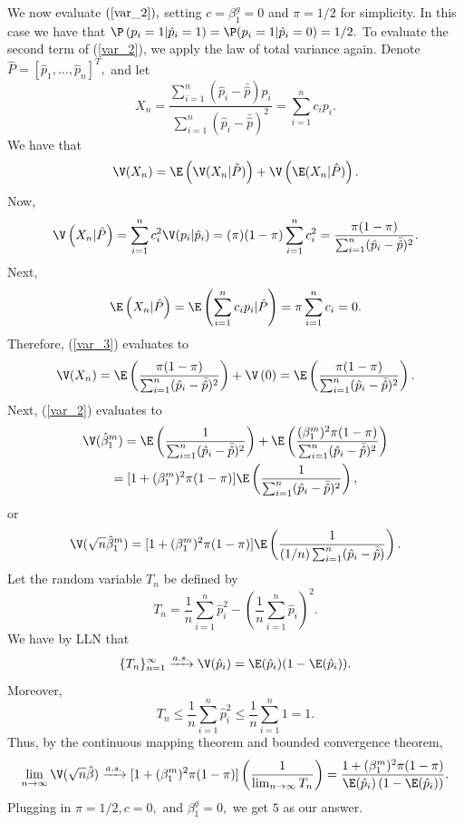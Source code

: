 \documentclass[12pt]{article}
\begin{document}
We now evaluate $(\ref{var_2}),$ setting $c = \beta_1^g = 0$ and $\pi = 1/2$ for simplicity. In this case we have that $\P\left(p_i = 1 | \hat{p}_i = 1 \right) = \P(p_i = 1 | \hat{p}_i = 0) = 1/2.$  To evaluate the second term of (\ref{var_2}), we apply the law of total variance again. Denote $\hat{P} = [\hat{p}_1, \dots, \hat{p}_n]^T,$ and let $$ X_n = \frac{ \sum_{i=1}^n (\hat{p}_i - \bar{\hat{p}} ) p_i}{ \sum_{i=1}^n (\hat{p}_i - \bar{\hat{p}})^2} = \sum_{i=1}^n c_i p_i.$$ We have that 
\begin{equation}\label{var_3}
\V(X_n)  = \E \left(\V( X_n | \hat{P} )\right) + \V \left( \E (X_n | \hat{P})\right).
\end{equation} Now,
$$\V \left( X_n | \hat{P} \right) = \sum_{i=1}^n c_i^2 \V(p_i  | \hat{p}_i ) = (\pi)(1-\pi) \sum_{i=1}^n c_i^2 = \frac{ \pi(1-\pi)}{\sum_{i=1}^n (\hat{p}_i - \bar{\hat{p}})^2}.$$
Next,
$$ \E \left( X_n | \hat{P} \right) = \E\left( \sum_{i=1}^n c_i p_i | \hat{P} \right) = \pi \sum_{i=1}^n c_i = 0.$$
Therefore, (\ref{var_3}) evaluates to
$$ \V(X_n) = \E \left( \frac{ \pi(1-\pi) }{ \sum_{i=1}^n (\hat{p}_i - \bar{\hat{p}})^2} \right) + \V \left(0\right)  =  \E \left( \frac{ \pi(1-\pi) }{ \sum_{i=1}^n (\hat{p}_i - \bar{\hat{p}})^2} \right).$$ Next, (\ref{var_2}) evaluates to
\begin{multline*}
\V(\hat{\beta}^m_1) = \E \left( \frac{ 1 }{\sum_{i=1}^n (\hat{p}_i - \bar{\hat{p}})^2} \right) + \E \left( \frac{(\beta_1^m)^2 \pi(1-\pi)}{ \sum_{i=1}^n (\hat{p}_i - \bar{\hat{p}})^2} \right) \\ =[1+(\beta_1^m)^2 \pi(1-\pi)] \E \left( \frac{1}{ \sum_{i=1}^n (\hat{p}_i - \bar{\hat{p}})^2 } \right),
\end{multline*}
or
\begin{equation}\label{var_4}
\V( \sqrt{n} \hat{\beta}^m_1 ) = [1 + (\beta^m_1)^2 \pi(1-\pi)] \E \left(\frac{1}{ (1/n) \sum_{i=1}^n  ( \hat{p}_i - \bar{\hat{p}})}\right).
\end{equation}
Let the random variable $T_n$ be defined by
$$T_n = \frac{1}{n}\sum_{i=1}^n \hat{p}_i^2 - \left(\frac{1}{n} \sum_{i=1}^n \hat{p}_i \right)^2.$$ We have by LLN that
$$\{ T_n\}_{n=1}^\infty \xrightarrow{a.s.} \V(\hat{p}_i) = \E(\hat{p}_i)( 1 - \E(\hat{p}_i)).$$
Moreover, 
$$T_n\leq \frac{1}{n} \sum_{i=1}^n \hat{p}_i^2 \leq \frac{1}{n} \sum_{i=1}^n 1 = 1.$$
Thus, by the continuous mapping theorem and bounded convergence theorem,
$$\lim_{n \to \infty} \V(\sqrt{n} \hat{\beta}) \xrightarrow{a.s.} [1 + (\beta^m_1)^2 \pi(1-\pi)] \left( \frac{1}{\lim_{n\to\infty} T_n} \right) = \frac{ 1 + (\beta^m_1)^2 \pi(1-\pi) }{ \E(\hat{p}_i) \left(1 - \E(\hat{p}_i)\right)}.$$ Plugging in $\pi = 1/2, c = 0,$ and $\beta^g_1 = 0,$ we get $5$ as our answer.
\end{document}
